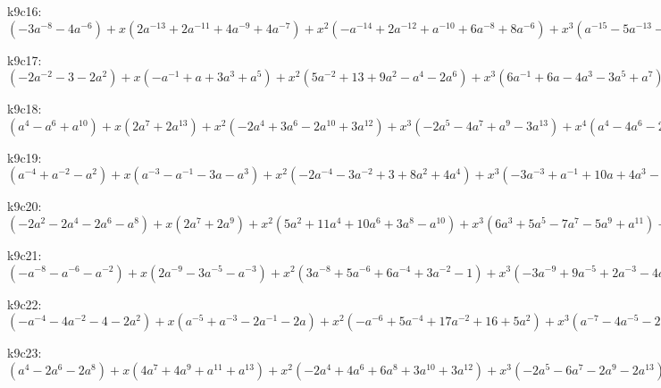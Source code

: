 k9c16: $ (-3a^{-8}-4a^{-6}) +x(2a^{-13}+2a^{-11}+4a^{-9}+4a^{-7}) +x^{2}(-a^{-14}+2a^{-12}+a^{-10}+6a^{-8}+8a^{-6}) +x^{3}(a^{-15}-5a^{-13}-5a^{-11}-a^{-9}-2a^{-7}) +x^{4}(3a^{-14}-6a^{-12}-8a^{-10}-4a^{-8}-5a^{-6}) +x^{5}(5a^{-13}-a^{-11}-8a^{-9}-2a^{-7}) +x^{6}(5a^{-12}+3a^{-10}-a^{-8}+a^{-6}) +x^{7}(3a^{-11}+4a^{-9}+a^{-7}) +x^{8}(a^{-10}+a^{-8}) $

k9c17: $ (-2a^{-2}-3-2a^{2}) +x(-a^{-1}+a+3a^{3}+a^{5}) +x^{2}(5a^{-2}+13+9a^{2}-a^{4}-2a^{6}) +x^{3}(6a^{-1}+6a-4a^{3}-3a^{5}+a^{7}) +x^{4}(-4a^{-2}-12-14a^{2}-3a^{4}+3a^{6}) +x^{5}(-7a^{-1}-13a-2a^{3}+4a^{5}) +x^{6}(a^{-2}+1+4a^{2}+4a^{4}) +x^{7}(2a^{-1}+5a+3a^{3}) +x^{8}(1+a^{2}) $

k9c18: $ (a^{4}-a^{6}+a^{10}) +x(2a^{7}+2a^{13}) +x^{2}(-2a^{4}+3a^{6}-2a^{10}+3a^{12}) +x^{3}(-2a^{5}-4a^{7}+a^{9}-3a^{13}) +x^{4}(a^{4}-4a^{6}-2a^{8}-2a^{10}-5a^{12}) +x^{5}(2a^{5}+a^{7}-5a^{9}-3a^{11}+a^{13}) +x^{6}(3a^{6}+2a^{8}+a^{10}+2a^{12}) +x^{7}(2a^{7}+4a^{9}+2a^{11}) +x^{8}(a^{8}+a^{10}) $

k9c19: $ (a^{-4}+a^{-2}-a^{2}) +x(a^{-3}-a^{-1}-3a-a^{3}) +x^{2}(-2a^{-4}-3a^{-2}+3+8a^{2}+4a^{4}) +x^{3}(-3a^{-3}+a^{-1}+10a+4a^{3}-2a^{5}) +x^{4}(a^{-4}-4-11a^{2}-8a^{4}) +x^{5}(2a^{-3}-a^{-1}-11a-7a^{3}+a^{5}) +x^{6}(2a^{-2}+2+3a^{2}+3a^{4}) +x^{7}(2a^{-1}+5a+3a^{3}) +x^{8}(1+a^{2}) $

k9c20: $ (-2a^{2}-2a^{4}-2a^{6}-a^{8}) +x(2a^{7}+2a^{9}) +x^{2}(5a^{2}+11a^{4}+10a^{6}+3a^{8}-a^{10}) +x^{3}(6a^{3}+5a^{5}-7a^{7}-5a^{9}+a^{11}) +x^{4}(-4a^{2}-11a^{4}-16a^{6}-6a^{8}+3a^{10}) +x^{5}(-7a^{3}-12a^{5}+5a^{9}) +x^{6}(a^{2}+a^{4}+5a^{6}+5a^{8}) +x^{7}(2a^{3}+5a^{5}+3a^{7}) +x^{8}(a^{4}+a^{6}) $

k9c21: $ (-a^{-8}-a^{-6}-a^{-2}) +x(2a^{-9}-3a^{-5}-a^{-3}) +x^{2}(3a^{-8}+5a^{-6}+6a^{-4}+3a^{-2}-1) +x^{3}(-3a^{-9}+9a^{-5}+2a^{-3}-4a^{-1}) +x^{4}(-5a^{-8}-7a^{-6}-9a^{-4}-6a^{-2}+1) +x^{5}(a^{-9}-3a^{-7}-10a^{-5}-3a^{-3}+3a^{-1}) +x^{6}(2a^{-8}+2a^{-6}+4a^{-4}+4a^{-2}) +x^{7}(2a^{-7}+5a^{-5}+3a^{-3}) +x^{8}(a^{-6}+a^{-4}) $

k9c22: $ (-a^{-4}-4a^{-2}-4-2a^{2}) +x(a^{-5}+a^{-3}-2a^{-1}-2a) +x^{2}(-a^{-6}+5a^{-4}+17a^{-2}+16+5a^{2}) +x^{3}(a^{-7}-4a^{-5}-2a^{-3}+10a^{-1}+7a) +x^{4}(3a^{-6}-9a^{-4}-23a^{-2}-15-4a^{2}) +x^{5}(5a^{-5}-4a^{-3}-16a^{-1}-7a) +x^{6}(6a^{-4}+7a^{-2}+2+a^{2}) +x^{7}(4a^{-3}+6a^{-1}+2a) +x^{8}(a^{-2}+1) $

k9c23: $ (a^{4}-2a^{6}-2a^{8}) +x(4a^{7}+4a^{9}+a^{11}+a^{13}) +x^{2}(-2a^{4}+4a^{6}+6a^{8}+3a^{10}+3a^{12}) +x^{3}(-2a^{5}-6a^{7}-2a^{9}-2a^{13}) +x^{4}(a^{4}-4a^{6}-8a^{8}-10a^{10}-7a^{12}) +x^{5}(2a^{5}+2a^{7}-6a^{9}-5a^{11}+a^{13}) +x^{6}(3a^{6}+4a^{8}+4a^{10}+3a^{12}) +x^{7}(2a^{7}+5a^{9}+3a^{11}) +x^{8}(a^{8}+a^{10}) $

